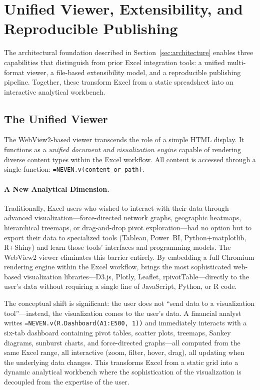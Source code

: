 
\section{Unified Viewer, Extensibility, and Reproducible Publishing}
\label{sec:viewer_extensibility}

The architectural foundation described in Section~\ref{sec:architecture} enables three capabilities that distinguish \neven{} from prior Excel integration tools: a unified multi-format viewer, a file-based extensibility model, and a reproducible publishing pipeline. Together, these transform Excel from a static spreadsheet into an interactive analytical workbench.

\subsection{The Unified Viewer}

The WebView2-based viewer transcends the role of a simple HTML display. It functions as a \emph{unified document and visualization engine} capable of rendering diverse content types within the Excel workflow. All content is accessed through a single function: \texttt{=NEVEN.v(content\_or\_path)}.

\paragraph{A New Analytical Dimension.}
Traditionally, Excel users who wished to interact with their data through advanced visualization---force-directed network graphs, geographic heatmaps, hierarchical treemaps, or drag-and-drop pivot exploration---had no option but to export their data to specialized tools (Tableau, Power~BI, Python+matplotlib, R+Shiny) and learn those tools' interfaces and programming models. The WebView2 viewer eliminates this barrier entirely. By embedding a full Chromium rendering engine within the Excel workflow, \neven{} brings the most sophisticated web-based visualization libraries---D3.js, Plotly, Leaflet, rpivotTable---directly to the user's data without requiring a single line of JavaScript, Python, or R code.

The conceptual shift is significant: the user does not ``send data to a visualization tool''---instead, the visualization comes to the user's data. A financial analyst writes \texttt{=NEVEN.v(R.Dashboard(A1:E500, 1))} and immediately interacts with a six-tab dashboard containing pivot tables, scatter plots, treemaps, Sankey diagrams, sunburst charts, and force-directed graphs---all computed from the same Excel range, all interactive (zoom, filter, hover, drag), all updating when the underlying data changes. This transforms Excel from a static grid into a dynamic analytical workbench where the sophistication of the visualization is decoupled from the expertise of the user.

